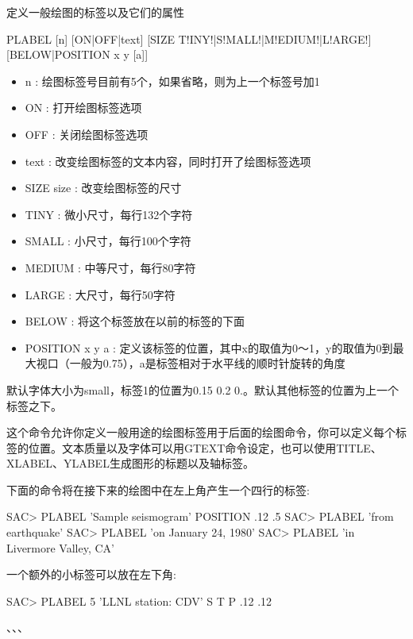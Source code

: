 \label{cmd:plabel}

定义一般绘图的标签以及它们的属性

\begin{SACSTX}
PLABEL [n] [ON|OFF|text] [SIZE T!INY!|S!MALL!|M!EDIUM!|L!ARGE!] 
    [BELOW|POSITION x y [a]]
\end{SACSTX}

\begin{itemize}
\item n : 绘图标签号目前有5个，如果省略，则为上一个标签号加1
\item ON : 打开绘图标签选项 
\item OFF : 关闭绘图标签选项 
\item text : 改变绘图标签的文本内容，同时打开了绘图标签选项 
\item SIZE size :  改变绘图标签的尺寸 
\item TINY : 微小尺寸，每行132个字符 
\item SMALL :  小尺寸，每行100个字符 
\item MEDIUM : 中等尺寸，每行80字符 
\item LARGE : 大尺寸，每行50字符 
\item BELOW : 将这个标签放在以前的标签的下面 
\item POSITION x y a : 定义该标签的位置，其中x的取值为0～1，y的取值为0到最大视口（一般为0.75），a是标签相对于水平线的顺时针旋转的角度
\end{itemize}

默认字体大小为small，标签1的位置为0.15 0.2 0.。默认其他标签的位置为上一个标签之下。

这个命令允许你定义一般用途的绘图标签用于后面的绘图命令，你可以定义每个标签的位置。文本质量以及字体可以用GTEXT命令设定，也可以使用TITLE、XLABEL、YLABEL生成图形的标题以及轴标签。

下面的命令将在接下来的绘图中在左上角产生一个四行的标签:
\begin{SACCode}
SAC> PLABEL 'Sample seismogram' POSITION .12 .5
SAC> PLABEL 'from earthquake'
SAC> PLABEL 'on January 24, 1980'
SAC> PLABEL 'in Livermore Valley, CA'
\end{SACCode}

一个额外的小标签可以放在左下角:
\begin{SACCode}
SAC> PLABEL 5 'LLNL station: CDV' S T P .12 .12
\end{SACCode}

、、、
